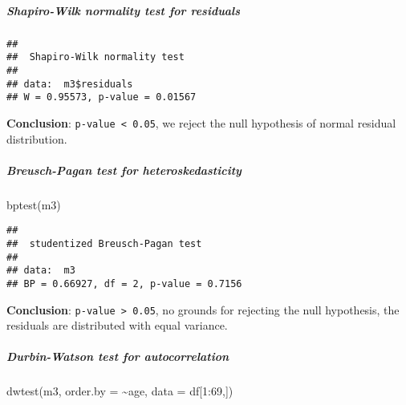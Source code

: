 \documentclass[
]{article}
\newenvironment{Shaded}{\begin{snugshade}}{\end{snugshade}}
\newcommand{\AttributeTok}[1]{\textcolor[rgb]{0.77,0.63,0.00}{#1}}
\newcommand{\DecValTok}[1]{\textcolor[rgb]{0.00,0.00,0.81}{#1}}
\newcommand{\FunctionTok}[1]{\textcolor[rgb]{0.00,0.00,0.00}{#1}}
\newcommand{\NormalTok}[1]{#1}
\newcommand{\SpecialCharTok}[1]{\textcolor[rgb]{0.00,0.00,0.00}{#1}}
\begin{document}
\hypertarget{shapiro-wilk-normality-test-for-residuals-2}{%
\subparagraph{Shapiro-Wilk normality test for
residuals}\label{shapiro-wilk-normality-test-for-residuals-2}}

\begin{Shaded}
\end{Shaded}

\begin{verbatim}
## 
##  Shapiro-Wilk normality test
## 
## data:  m3$residuals
## W = 0.95573, p-value = 0.01567
\end{verbatim}

\textbf{Conclusion}: \texttt{p-value\ \textless{}\ 0.05}, we reject the
null hypothesis of normal residual distribution.

\hypertarget{breusch-pagan-test-for-heteroskedasticity-2}{%
\subparagraph{Breusch-Pagan test for
heteroskedasticity}\label{breusch-pagan-test-for-heteroskedasticity-2}}

\begin{Shaded}
\begin{Highlighting}[]
\FunctionTok{bptest}\NormalTok{(m3)}
\end{Highlighting}
\end{Shaded}

\begin{verbatim}
## 
##  studentized Breusch-Pagan test
## 
## data:  m3
## BP = 0.66927, df = 2, p-value = 0.7156
\end{verbatim}

\textbf{Conclusion}: \texttt{p-value\ \textgreater{}\ 0.05}, no grounds
for rejecting the null hypothesis, the residuals are distributed with
equal variance.

\hypertarget{durbin-watson-test-for-autocorrelation-2}{%
\subparagraph{Durbin-Watson test for
autocorrelation}\label{durbin-watson-test-for-autocorrelation-2}}

\begin{Shaded}
\begin{Highlighting}[]
\FunctionTok{dwtest}\NormalTok{(m3, }\AttributeTok{order.by =} \SpecialCharTok{\textasciitilde{}}\NormalTok{age, }\AttributeTok{data =}\NormalTok{ df[}\DecValTok{1}\SpecialCharTok{:}\DecValTok{69}\NormalTok{,])}
\end{Highlighting}
\end{Shaded}
\end{document}
